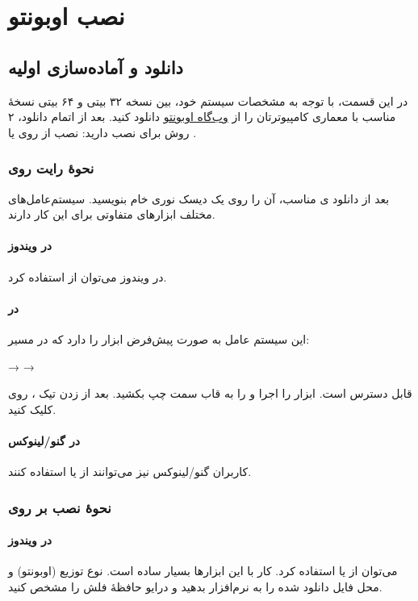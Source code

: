 \chapter{نصب اوبونتو}
\section{دانلود و آماده‌سازی اولیه}
در این قسمت، با توجه به مشخصات سیستم خود، بین نسخه ۳۲ بیتی و ۶۴ بیتی نسخهٔ مناسب با معماری کامپیوترتان را از \href{http://www.ubuntu.com/download/desktop}{وب‌گاه اوبونتو} دانلود کنید. بعد از اتمام دانلود، ۲ روش برای نصب دارید: نصب از روی  یا .

\subsection[نحوهٔ رایت روی DVD]{نحوهٔ رایت روی }
بعد از دانلود  ی مناسب، آن را روی یک دیسک نوری خام بنویسید. سیستم‌عامل‌های مختلف ابزارهای متفاوتی برای این کار دارند.

\subsubsection{در ویندوز}
در ویندوز می‌توان از \href{http://infrarecorder.org/}{} استفاده کرد.

\subsubsection{در }
این سیستم عامل به صورت پیش‌فرض ابزار  را دارد که در مسیر:
\begin{center}
 \textsf{→}  \textsf{→} \\
\end{center}
قابل دسترس است. ابزار  را اجرا و  را به قاب سمت چپ بکشید. بعد از زدن تیک ، روی  کلیک کنید.

\subsubsection{در گنو/لینوکس}
کاربران گنو/لینوکس نیز می‌توانند از  یا  استفاده کنند.

\subsection[نحوهٔ نصب بر روی USB]{نحوهٔ نصب بر روی }
\subsubsection{در ویندوز}
می‌توان از \href{http://www.pendrivelinux.com/}{} یا \href{http://www.linuxliveusb.com/}{} استفاده کرد. کار با این ابزارها بسیار ساده است. نوع توزیع (اوبونتو) و محل فایل  دانلود شده را به نرم‌افزار بدهید و درایو حافظهٔ فلش را مشخص کنید.

